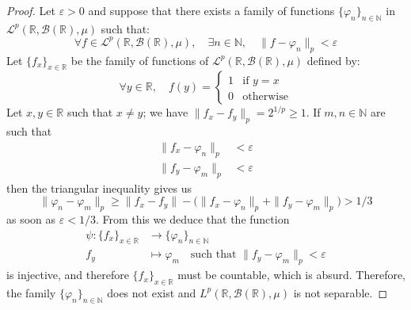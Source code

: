 \documentclass[11pt,a4paper,twoside]{article}
\theoremstyle{definition}
\begin{document}
\begin{proof}
  Let $\varepsilon > 0$ and suppose that there exists a family of functions $\{ \varphi_n \}_{n \in \mathbb{N}}$
  in $\mathscr{L}^p ( \mathbb{R}, \mathscr{B} ( \mathbb{R} ), \mu )$ such that:
  \begin{equation*}
    \forall f \in \mathscr{L}^p ( \mathbb{R}, \mathscr{B} ( \mathbb{R} ), \mu ), \quad\exists n \in \mathbb{N}, \quad \| f - \varphi_n \|_p < \varepsilon
  \end{equation*}
  Let $\{ f_x \}_{x \in \mathbb{R}}$ be the family of functions of $\mathscr{L}^p ( \mathbb{R}, \mathscr{B} ( \mathbb{R} ), \mu )$ defined by:
  \begin{equation*}
    \forall y \in \mathbb{R}, \quad f ( y ) = \begin{cases}
      1 &\text{if } y = x \\
      0 &\text{otherwise}
    \end{cases}
  \end{equation*}
  Let $x, y \in \mathbb{R}$ such that $x \neq y$; we have $\| f_x - f_y \|_p = 2^{1 / p} \geq 1$. If $m, n \in \mathbb{N}$ are such that
  \begin{align*}
    \| f_x - \varphi_n \|_p &< \varepsilon \\
    \| f_y - \varphi_m \|_p &< \varepsilon
  \end{align*}
  then the triangular inequality gives us
  \begin{equation*}
    \| \varphi_n - \varphi_m \|_p \geq \| f_x - f_y \| - \big( \| f_x - \varphi_n \|_p + \| f_y - \varphi_m \|_p \big) > 1 / 3
  \end{equation*}
  as soon as $\varepsilon < 1 / 3$. From this we deduce that the function
  \begin{align*}
    \psi : \{ f_x \}_{x \in \mathbb{R}} &\to \{ \varphi_n \}_{n \in \mathbb{N}} \\
    f_y &\mapsto \varphi_m \quad\text{such that } \| f_y - \varphi_m \|_p < \varepsilon
  \end{align*}
  is injective, and therefore $\{ f_x \}_{x \in \mathbb{R}}$ must be countable, which is absurd. Therefore, the family $\{ \varphi_n \}_{n \in \mathbb{N}}$
  does not exist and $L^p ( \mathbb{R}, \mathscr{B} ( \mathbb{R} ), \mu )$ is not separable.

\end{proof}
\end{document}
